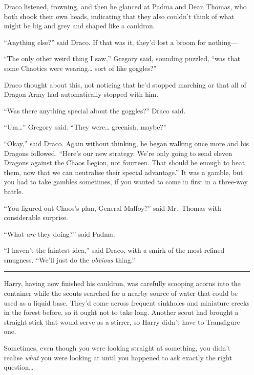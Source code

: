 Draco listened, frowning, and then he glanced at Padma and Dean Thomas,
who both shook their own heads, indicating that they also couldn't think
of what might be big and grey and shaped like a cauldron.

``Anything else?'' said Draco. If that was it, they'd lost a broom for
nothing---

``The only other weird thing I saw,'' Gregory said, sounding puzzled,
``was that some Chaotics were wearing\ldots{} sort of like goggles?''

Draco thought about this, not noticing that he'd stopped marching or
that all of Dragon Army had automatically stopped with him.

``Was there anything special about the goggles?'' Draco said.

``Um\ldots{}'' Gregory said. ``They were\ldots{} greenish, maybe?''

``Okay,'' said Draco. Again without thinking, he began walking once more
and his Dragons followed. ``Here's our new strategy. We're only going to
send eleven Dragons against the Chaos Legion, not fourteen. That should
be enough to beat them, now that we can neutralise their special
advantage.'' It was a gamble, but you had to take gambles sometimes, if
you wanted to come in first in a three-way battle.

``You figured out Chaos's plan, General Malfoy?'' said Mr.~Thomas with
considerable surprise.

``What \emph{are} they doing?'' said Padma.

``I haven't the faintest idea,'' said Draco, with a smirk of the most
refined smugness. ``We'll just do the \emph{obvious} thing.''

\begin{center}\rule{3in}{0.4pt}\end{center}

Harry, having now finished his cauldron, was carefully scooping acorns
into the container while the scouts searched for a nearby source of
water that could be used as a liquid base. They'd come across frequent
sinkholes and miniature creeks in the forest before, so it ought not to
take long. Another scout had brought a straight stick that would serve
as a stirrer, so Harry didn't have to Transfigure one.

Sometimes, even though you were looking straight at something, you
didn't realise \emph{what} you were looking at until you happened to ask
exactly the right question\ldots{}

